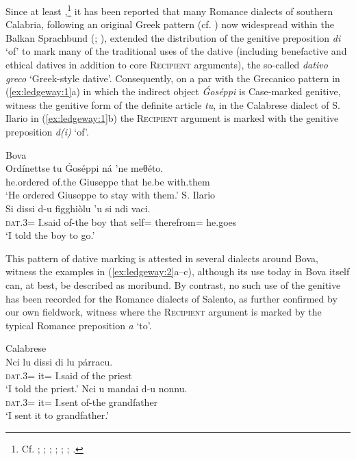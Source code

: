 \documentclass[output=paper,modfonts,nonflat,colorlinks,citecolor=brown]{langsci/langscibook}
\begin{document}
Since at least \citet[§639]{Rohlfs1969},\footnote{Cf. \citet[§639]{Rohlfs1969}; \citet[232--233]{Trumper2003}; \citet[209]{Vincent1997}; \citet[243, 427--429]{Katsoyannou1995}; \citet[54--55]{Katsoyannou2001}; \citet[140--141]{Ralli2006}; \citet[192--196]{Ledgeway2013}.} it has been reported that many Romance dialects of southern Calabria, following an original Greek pattern (cf. \citealt[160]{Joseph1990}) now widespread within the Balkan Sprachbund (\citealt[187]{Sandfeld1930}; \citealt{Pompeo2012}), extended the distribution of the genitive preposition \textit{di} ‘of’ to mark many of the traditional uses of the dative (including benefactive and ethical datives in addition to core \textsc{Recipient} arguments), the so-called \textit{dativo greco} `Greek-style dative'. Consequently, on a par with the Grecanico pattern in (\ref{ex:ledgeway:1}a) in which the indirect object \textit{Ǵoséppi} is Case-marked genitive, witness the genitive form of the definite article \textit{tu}, in the Calabrese dialect of S. Ilario in (\ref{ex:ledgeway:1}b) the \textsc{Recipient} argument is marked with the genitive preposition \textit{d(i)} ‘of’. 

\ea\label{ex:ledgeway:1}
\ea  Bova  \\
  \gll Ordínettse  tu  Ǵoséppi  ná  ’ne  meθéto.\\  
    he.ordered  of.the  Giuseppe  that  he.be  with.them\\
    \glt `He ordered Giuseppe to stay with them.'
  \ex S. Ilario\\
    \gll Si  dissi  d-u  figghiòlu  ’u  si  ndi  vaci.\\ 
    \textsc{dat}.3=  I.said  of-the  boy  that  self=  therefrom=  he.goes \\
    \glt `I told the boy to go.'
    \z
    \z
    

This pattern of dative marking is attested in several dialects around Bova, witness the examples in (\ref{ex:ledgeway:2}a--c), although its use today in Bova itself can, at best, be described as moribund. By contrast, no such use of the genitive has been recorded for the Romance dialects of Salento, as further confirmed by our own fieldwork, witness  where the \textsc{Recipient} argument is marked by the typical Romance preposition \textit{a} ‘to’.

\ea\label{ex:ledgeway:2}
Calabrese  \\
\ea
	\gll Nci  lu  dissi  di  lu  párracu.\\
    \textsc{dat}.3=   it=  I.said  of  the  priest\\
    \glt `I told the priest.'
 \ex \gll Nci  u  mandai  d-u  nonnu.  \\
    \textsc{dat}.3=  it=  I.sent  of-the  grandfather\\
    \glt `I sent it to grandfather.'
    
\end{document}
